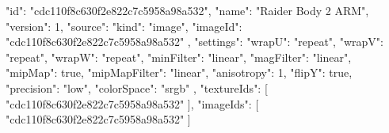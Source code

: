 {
  "id": "cdc110f8c630f2e822c7c5958a98a532",
  "name": "Raider Body 2 ARM",
  "version": 1,
  "source": {
    "kind": "image",
    "imageId": "cdc110f8c630f2e822c7c5958a98a532"
  },
  "settings": {
    "wrapU": "repeat",
    "wrapV": "repeat",
    "wrapW": "repeat",
    "minFilter": "linear",
    "magFilter": "linear",
    "mipMap": true,
    "mipMapFilter": "linear",
    "anisotropy": 1,
    "flipY": true,
    "precision": "low",
    "colorSpace": "srgb"
  },
  "textureIds": [
    "cdc110f8c630f2e822c7c5958a98a532"
  ],
  "imageIds": [
    "cdc110f8c630f2e822c7c5958a98a532"
  ]
}

